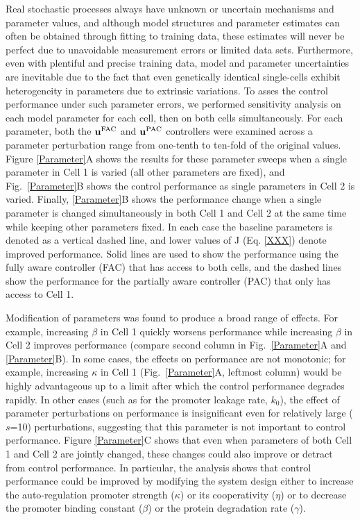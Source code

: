 \documentclass[12pt]{iopart}
\begin{document}
Real stochastic processes always have unknown or uncertain mechanisms and parameter values, and although model structures and parameter estimates can often be obtained through fitting to training data, these estimates will never be perfect due to unavoidable measurement errors or limited data sets. 
Furthermore, even with plentiful and precise training data, model and parameter uncertainties are inevitable due to the fact that even genetically identical single-cells exhibit heterogeneity in parameters due to extrinsic variations.
To asses the control performance under such parameter errors, we performed sensitivity analysis on each model parameter for each cell, then on both cells simultaneously. 
For each parameter, both the $\mathbf{u}^{\rm FAC}$ and $\mathbf{u}^{\rm PAC}$ controllers were examined across a parameter perturbation range from one-tenth to ten-fold of the original values.
Figure \ref{Parameter}A shows the results for these parameter sweeps when a single parameter in Cell 1 is varied (all other parameters are fixed), and Fig.\ \ref{Parameter}B shows the control performance as single parameters in Cell 2 is varied. 
Finally, \ref{Parameter}B shows the performance change when a single parameter is changed simultaneously in both Cell 1 and Cell 2 at the same time while keeping other parameters fixed.
In each case the baseline parameters is denoted as a vertical dashed line, and lower values of J (Eq. \ref{XXX}) denote improved performance. 
Solid lines are used to show the performance using the fully aware controller (FAC) that has access to both cells, and the dashed lines show the performance for the partially aware controller (PAC) that only has access to Cell 1.

Modification of parameters was found to produce a broad range of effects. 
For example, increasing $\beta$ in Cell 1 quickly worsens performance while increasing $\beta$ in Cell 2 improves performance (compare second column in Fig.\ \ref{Parameter}A and \ref{Parameter}B). 
In some cases, the effects on performance are not monotonic; for example, increasing $\kappa$ in Cell 1 (Fig.\ \ref{Parameter}A, leftmost column) would be highly advantageous up to a limit after which the control performance degrades rapidly. 
In other cases (such as for the promoter leakage rate, $k_0$), the effect of parameter perturbations on performance is insignificant even for relatively large ($s$=10) perturbations, suggesting that this parameter is not important to control performance.
Figure \ref{Parameter}C shows that even when parameters of both Cell 1 and Cell 2 are jointly changed, these changes could also improve or detract from control performance. 
In particular, the analysis shows that control performance could be improved by modifying the system design either to increase the auto-regulation promoter strength ($\kappa$) or its cooperativity ($\eta$) or to decrease the promoter binding constant ($\beta$) or the protein degradation rate ($\gamma$). 
\end{document}
